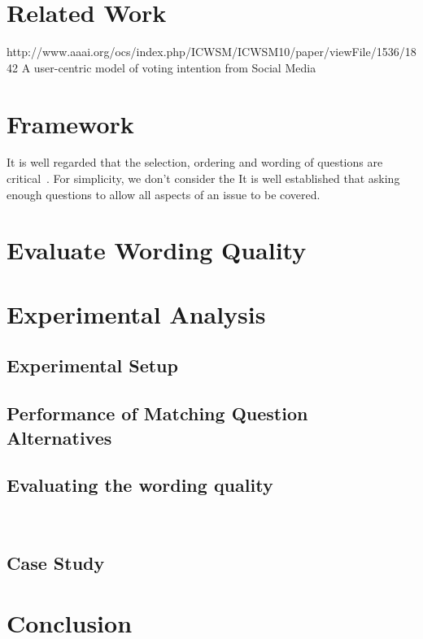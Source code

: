 \documentclass{llncs}
\begin{document}
\section{Related Work}\label{sec:relatedwork}
http://www.aaai.org/ocs/index.php/ICWSM/ICWSM10/paper/viewFile/1536/1842
A user-centric model of voting intention from Social Media




\section{Framework}\label{sec:framework}
 It is well regarded that the selection, ordering and wording of questions are critical~\cite{}. For simplicity, we don't consider the 
It is well established that asking enough questions to allow all aspects of an issue to be covered. 


\section{Evaluate Wording Quality}\label{sec:wordingquality}








\section{Experimental Analysis}\label{sec:experiment}
\subsection{Experimental Setup}

\subsection{Performance of Matching Question Alternatives}

\subsection{Evaluating the wording quality}

~\cite{Trochim2000Research}

\subsection{Case Study}


\section{Conclusion}\label{sec:conclusion}
%

\end{document}
